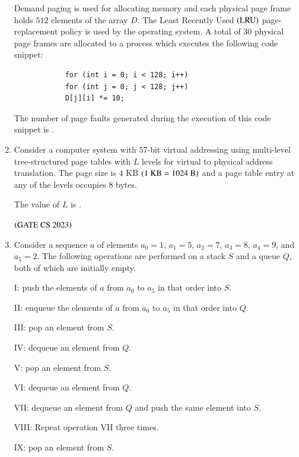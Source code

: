 \documentclass[journal,12pt,onecolumn]{IEEEtran}
\theoremstyle{remark}
\begin{document}
\begin{enumerate}
		Demand paging is used for allocating memory and each physical page frame holds $512$ elements of the array $D$. The Least Recently Used $\left(\text{LRU}\right)$ page-replacement policy is used by the operating system. A total of $30$ physical page frames are allocated to a process which executes the following code snippet:
		
		\begin{verbatim}
			for (int i = 0; i < 128; i++)
			for (int j = 0; j < 128; j++)
			D[j][i] *= 10;
		\end{verbatim}
		
		The number of page faults generated during the execution of this code snippet is \underline{\hspace{2cm}}.
		
		\hfill{}
			
			\item Consider a computer system with $57$-bit virtual addressing using multi-level tree-structured page tables with $L$ levels for virtual to physical address translation. The page size is $4$ KB $\left(1 \text{ KB} = 1024 \text{ B}\right)$ and a page table entry at any of the levels occupies $8$ bytes.
			
			The value of $L$ is \underline{\hspace{2cm}}.
			
			\hfill $\left(\text{GATE CS 2023}\right)$
			
			\item Consider a sequence $a$ of elements $a_0 = 1$, $a_1 = 5$, $a_2 = 7$, $a_3 = 8$, $a_4 = 9$, and $a_5 = 2$. The following operations are performed on a stack $S$ and a queue $Q$, both of which are initially empty.
			
			I: push the elements of $a$ from $a_0$ to $a_5$ in that order into $S$.
			
			II: enqueue the elements of $a$ from $a_0$ to $a_5$ in that order into $Q$.
			
			III: pop an element from $S$.
			
			IV: dequeue an element from $Q$.
			
			V: pop an element from $S$.
			
			VI: dequeue an element from $Q$.
			
			VII: dequeue an element from $Q$ and push the same element into $S$.
			
			VIII: Repeat operation VII three times.
			
			IX: pop an element from $S$.
			

\end{enumerate}
\end{document}
